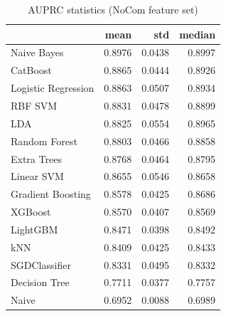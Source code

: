 \begin{table}
\caption{AUPRC statistics (NoCom feature set)}
\label{tab:auprc_NoCom_stats}
\begin{tabular}{lrrr}
\toprule
 & mean & std & median \\
\midrule
Naive Bayes & 0.8976 & 0.0438 & 0.8997 \\
CatBoost & 0.8865 & 0.0444 & 0.8926 \\
Logistic Regression & 0.8863 & 0.0507 & 0.8934 \\
RBF SVM & 0.8831 & 0.0478 & 0.8899 \\
LDA & 0.8825 & 0.0554 & 0.8965 \\
Random Forest & 0.8803 & 0.0466 & 0.8858 \\
Extra Trees & 0.8768 & 0.0464 & 0.8795 \\
Linear SVM & 0.8655 & 0.0546 & 0.8658 \\
Gradient Boosting & 0.8578 & 0.0425 & 0.8686 \\
XGBoost & 0.8570 & 0.0407 & 0.8569 \\
LightGBM & 0.8471 & 0.0398 & 0.8492 \\
kNN & 0.8409 & 0.0425 & 0.8433 \\
SGDClassifier & 0.8331 & 0.0495 & 0.8332 \\
Decision Tree & 0.7711 & 0.0377 & 0.7757 \\
Naive & 0.6952 & 0.0088 & 0.6989 \\
\bottomrule
\end{tabular}
\end{table}
